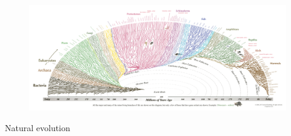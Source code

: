 \documentclass[aspectratio=169]{beamer}
\makeatletter
\renewcommand{\emphasis}[1]{{\Huge \color{pureminimalistic@text@red} #1}}
\makeatother
\begin{document}
% 
% 
% 
% 

% 

{
\begin{frame}[plain]
  \begin{figure}
  \centering
  \includegraphics[width=1.0\linewidth,keepaspectratio]{figures/tree_of_life.png}
  \end{figure}
  \begin{center}
      \emphasis{Natural evolution}
  \end{center}
\end{frame}
}
\end{document}
